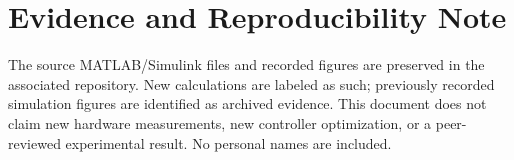\documentclass[11pt,a4paper]{article}
\begin{document}
\section*{Evidence and Reproducibility Note}
The source MATLAB/Simulink files and recorded figures are preserved in the associated repository. New calculations are labeled as such; previously recorded simulation figures are identified as archived evidence. This document does not claim new hardware measurements, new controller optimization, or a peer-reviewed experimental result. No personal names are included.
\end{document}
